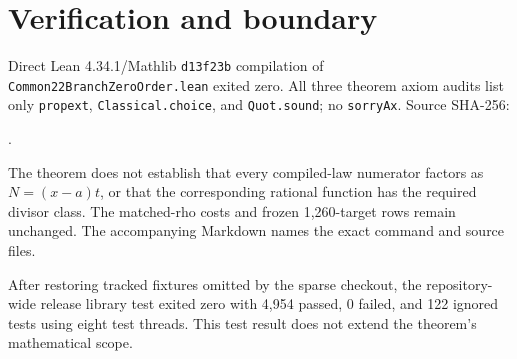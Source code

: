 \documentclass[11pt]{article}
\begin{document}
\section*{Verification and boundary}
Direct Lean 4.34.1/Mathlib \texttt{d13f23b} compilation of \texttt{Common22BranchZeroOrder.lean} exited zero. All three theorem axiom audits list only \texttt{propext}, \texttt{Classical.choice}, and \texttt{Quot.sound}; no \texttt{sorryAx}. Source SHA-256:\par\smallskip{}.

The theorem does not establish that every compiled-law numerator factors as $N=(x-a)t$, or that the corresponding rational function has the required divisor class. The matched-rho costs and frozen 1,260-target rows remain unchanged. The accompanying Markdown names the exact command and source files.

After restoring tracked fixtures omitted by the sparse checkout, the repository-wide release library test exited zero with 4,954 passed, 0 failed, and 122 ignored tests using eight test threads. This test result does not extend the theorem's mathematical scope.
\end{document}
